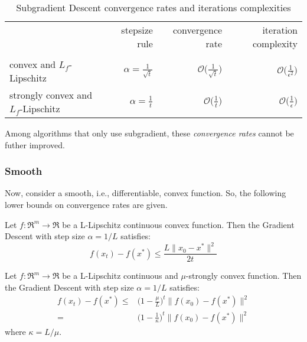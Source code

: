 \begin{table}[H]
\centering
\caption{Subgradient Descent convergence rates and iterations complexities}
\label{subgradient_rates}
\begin{tabular}{lrrr}
\toprule
	& stepsize rule & convergence rate & iteration complexity \\
 	& 		& 		& 		\\
\midrule
convex and $L_f$-Lipschitz & $\displaystyle \alpha = \frac{1}{\sqrt{t}}$ & $\displaystyle \mathcal{O}\Bigg(\frac{1}{\sqrt{t}}\Bigg)$ & $\displaystyle \mathcal{O}\Bigg(\frac{1}{\epsilon^2}\Bigg)$ \\
strongly convex and $L_f$-Lipschitz & $\displaystyle \alpha = \frac{1}{t}$ & $\displaystyle \mathcal{O}\Bigg(\frac{1}{t}\Bigg)$ & $\displaystyle \mathcal{O}\Bigg(\frac{1}{\epsilon}\Bigg)$ \\
\bottomrule
\end{tabular}
\end{table}

Among algorithms that only use subgradient, these \emph{convergence rates} cannot be futher improved.


\subsubsection{Smooth}

Now, consider a smooth, i.e., differentiable, convex function. So, the following lower bounds on convergence rates are given.

\begin{theorem}[\href{https://erwanscornet.github.io/teaching/Optimization.pdf\#page=44}{Gradient Descent convergence for convex functions}] \label{thm:cvx_gd_convergence}
Let $f: \Re^m \rightarrow \Re$ be a L-Lipschitz continuous convex function. Then the Gradient Descent with step size $\alpha = 1/L$ satisfies:
$$
f(x_t) - f(x^*) \leq \frac{L \| x_0 - x^* \|^2}{2 t}
$$
\end{theorem}

\begin{theorem}[\href{https://erwanscornet.github.io/teaching/Optimization.pdf\#page=47}{Gradient Descent convergence for strongly convex functions}] \label{thm:str_cvx_gd_convergence}
Let $f: \Re^m \rightarrow \Re$ be a L-Lipschitz continuous and $\mu$-strongly convex function. Then the Gradient Descent with step size $\alpha = 1/L$ satisfies:
$$
\begin{aligned}
	f(x_t) - f(x^*) \leq & \bigg(1 - \frac{\mu}{L}\bigg)^t \| f(x_0) - f(x^*) \|^2 \\
						= & \bigg(1 - \frac{1}{\kappa}\bigg)^t \| f(x_0) - f(x^*) \|^2
\end{aligned}
$$
where $\kappa = L/\mu$.
\end{theorem}

